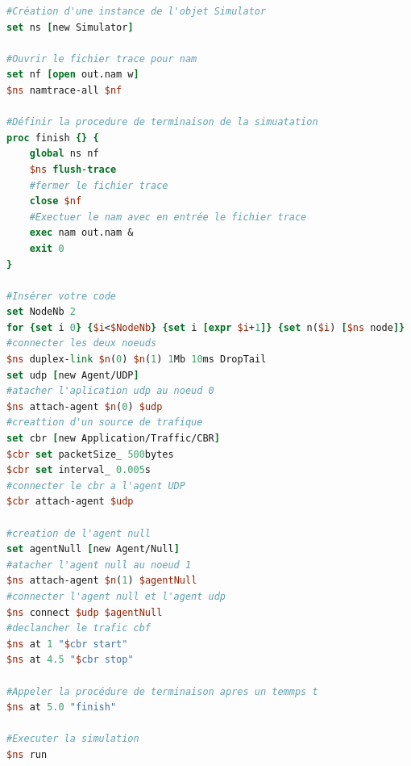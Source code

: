 \documentclass[11pt]{article}
\begin{document}
\begin{lstlisting}[language=tcl, label={tp1Exo1}, caption={TP1 - Exercice1}]
#Création d'une instance de l'objet Simulator
set ns [new Simulator]

#Ouvrir le fichier trace pour nam
set nf [open out.nam w]
$ns namtrace-all $nf

#Définir la procedure de terminaison de la simuatation
proc finish {} {
	global ns nf
	$ns flush-trace
	#fermer le fichier trace
	close $nf
	#Exectuer le nam avec en entrée le fichier trace
	exec nam out.nam &
	exit 0
}

#Insérer votre code
set NodeNb 2
for {set i 0} {$i<$NodeNb} {set i [expr $i+1]} {set n($i) [$ns node]}
#connecter les deux noeuds
$ns duplex-link $n(0) $n(1) 1Mb 10ms DropTail
set udp [new Agent/UDP]
#atacher l'aplication udp au noeud 0
$ns attach-agent $n(0) $udp 
#creattion d'un source de trafique
set cbr [new Application/Traffic/CBR]
$cbr set packetSize_ 500bytes
$cbr set interval_ 0.005s
#connecter le cbr a l'agent UDP
$cbr attach-agent $udp

#creation de l'agent null
set agentNull [new Agent/Null]
#atacher l'agent null au noeud 1
$ns attach-agent $n(1) $agentNull 
#connecter l'agent null et l'agent udp
$ns connect $udp $agentNull 
#declancher le trafic cbf
$ns at 1 "$cbr start"
$ns at 4.5 "$cbr stop"

#Appeler la procédure de terminaison apres un temmps t 
$ns at 5.0 "finish"

#Executer la simulation
$ns run
\end{lstlisting} 

~\\
\end{document}
